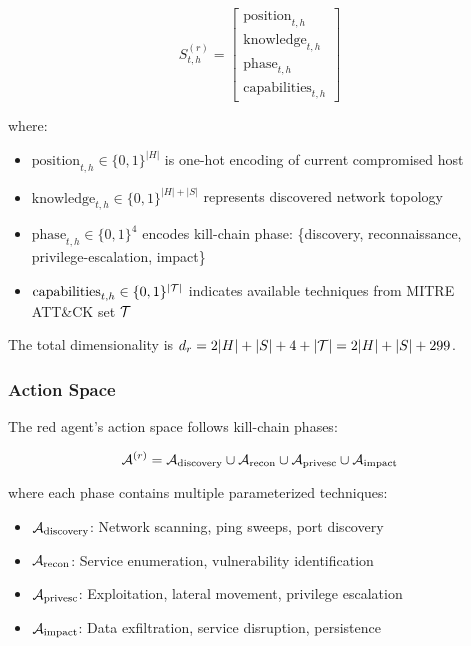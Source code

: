 \documentclass[11pt]{article}
\newcounter{phase}[algorithm]
\theoremstyle{definition}
\theoremstyle{plain}
\begin{document}
\begin{equation}
S_{t,h}^{(r)} = \begin{bmatrix}
\text{position}_{t,h} \\
\text{knowledge}_{t,h} \\
\text{phase}_{t,h} \\
\text{capabilities}_{t,h}
\end{bmatrix}
\end{equation}

where:
\begin{itemize}
    \item $\text{position}_{t,h} \in \{0,1\}^{|H|}$ is one-hot encoding of current compromised host
    \item $\text{knowledge}_{t,h} \in \{0,1\}^{|H| + |S|}$ represents discovered network topology
    \item $\text{phase}_{t,h} \in \{0,1\}^4$ encodes kill-chain phase: \{discovery, reconnaissance, privilege-escalation, impact\}
    \item $\text{capabilities}_{t,h} \in \{0,1\}^{|\mathcal{T}|}$ indicates available techniques from MITRE ATT\&CK set $\mathcal{T}$
\end{itemize}

The total dimensionality is $d_r = 2|H| + |S| + 4 + |\mathcal{T}| = 2|H| + |S| + 299$.

\subsubsection{Action Space}
The red agent's action space follows kill-chain phases:

\begin{equation}
\mathcal{A}^{(r)} = \mathcal{A}_{\text{discovery}} \cup \mathcal{A}_{\text{recon}} \cup \mathcal{A}_{\text{privesc}} \cup \mathcal{A}_{\text{impact}}
\end{equation}

where each phase contains multiple parameterized techniques:
\begin{itemize}
    \item $\mathcal{A}_{\text{discovery}}$: Network scanning, ping sweeps, port discovery
    \item $\mathcal{A}_{\text{recon}}$: Service enumeration, vulnerability identification
    \item $\mathcal{A}_{\text{privesc}}$: Exploitation, lateral movement, privilege escalation
    \item $\mathcal{A}_{\text{impact}}$: Data exfiltration, service disruption, persistence
\end{itemize}
\end{document}
